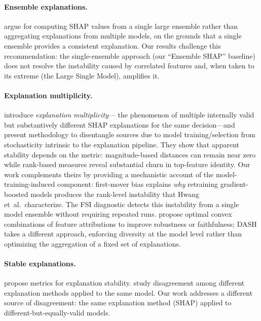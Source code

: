 \documentclass[11pt]{article}
\newcommand{\dash}{\textsc{DASH}}
\begin{document}
\paragraph{Ensemble explanations.}
\citet{paillard2025ensemble} argue for computing SHAP values from a single
large ensemble rather than aggregating explanations from multiple models,
on the grounds that a single ensemble provides a consistent explanation.
Our results challenge this recommendation: the single-ensemble approach
(our ``Ensemble SHAP'' baseline) does not resolve the instability caused
by correlated features and, when taken to its extreme (the Large Single
Model), amplifies it.

\paragraph{Explanation multiplicity.}
\citet{hwang2026explanation} introduce \emph{explanation multiplicity}---
the phenomenon of multiple internally valid but substantively different
SHAP explanations for the same decision---and present methodology to
disentangle sources due to model training/selection from stochasticity
intrinsic to the explanation pipeline. They show that apparent stability
depends on the metric: magnitude-based distances can remain near zero
while rank-based measures reveal substantial churn in top-feature
identity. Our work complements theirs by providing a mechanistic account
of the model-training-induced component: first-mover bias explains
\emph{why} retraining gradient-boosted models produces the rank-level
instability that Hwang et~al.\ characterize. The FSI diagnostic detects
this instability from a single model ensemble without requiring repeated
runs. \citet{decker2024provably} propose optimal convex combinations of
feature attributions to improve robustness or faithfulness; \dash{} takes
a different approach, enforcing diversity at the model level rather than
optimizing the aggregation of a fixed set of explanations.

\paragraph{Stable explanations.}
\citet{alvarez2018towards} propose metrics for explanation stability.
\citet{krishna2022disagreement} study disagreement among different
explanation methods applied to the same model. Our work addresses a
different source of disagreement: the same explanation method (SHAP)
applied to different-but-equally-valid models.
\end{document}
